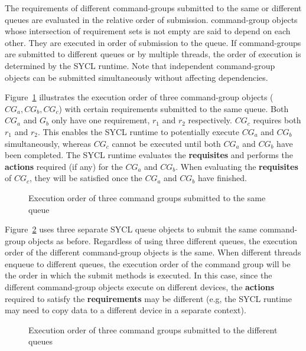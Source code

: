 The requirements of different \glspl{command-group} submitted to the same 
or different queues are evaluated in the relative order of submission.
\gls{command-group} objects whose intersection of requirement sets is
not empty are said to depend on each other. 
They are executed in order of submission to the queue. 
If \glspl{command-group} are submitted to different queues or by multiple
threads, the order of execution is determined by the SYCL runtime.
Note that independent \gls{command-group} objects can be submitted 
simultaneously without affecting dependencies.

Figure~\ref{fig:three-cg-one-queue} illustrates the execution order of three 
\gls{command-group} objects ($CG_a,CG_b,CG_c$) with certain requirements 
submitted to the same queue. 
Both $CG_a$ and $G_b$ only have one requirement, $r_1$ and $r_2$ respectively.
$CG_c$ requires both $r_1$ and $r_2$. 
This enables the SYCL runtime to potentially execute $CG_a$ and $CG_b$ 
simultaneously, whereas $CG_c$ cannot be executed until both $CG_a$ and $CG_b$
have been completed.
The SYCL runtime evaluates the \textbf{requisites} and performs the
\textbf{actions} required (if any) for the $CG_a$ and $CG_b$. 
When evaluating the \textbf{requisites} of $CG_c$, they will be satisfied
once the $CG_a$ and $CG_b$ have finished.

\begin{figure}[h]
\centering

\caption{Execution order of three command groups submitted to the same queue}
\label{fig:three-cg-one-queue}
\end{figure}

Figure~\ref{fig:three-cg-three-queue} uses three separate SYCL queue objects
to submit the same \gls{command-group} objects as before. 
Regardless of using three different queues, the execution order
of the different \gls{command-group} objects is the same.
When different threads enqueue to different queues, the execution order
of the command group will be the order in which the submit methods is executed.
In this case, since the different \gls{command-group} objects execute on 
different devices, the \textbf{actions} required to satisfy the 
\textbf{requirements} may be different (e.g, the SYCL runtime may 
need to copy data to a different device in a separate context).

\begin{figure}[h]
\centering

\caption{Execution order of three command groups submitted to the different
  queues}
\label{fig:three-cg-three-queue}
\end{figure}

